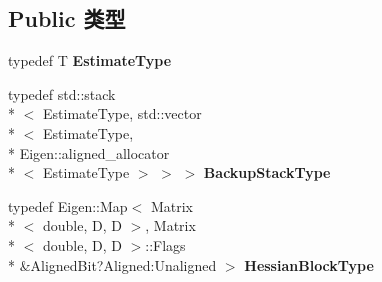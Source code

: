 \subsection*{Public 类型}
\begin{DoxyCompactItemize}
\item 
\hypertarget{classg2o_1_1BaseVertex_aaffb179a0d591da4769ec7c3fc7f7daa}{typedef T {\bfseries Estimate\-Type}}\label{classg2o_1_1BaseVertex_aaffb179a0d591da4769ec7c3fc7f7daa}

\item 
\hypertarget{classg2o_1_1BaseVertex_ae6632291d46b458196bdb021a6c8cba1}{typedef std\-::stack\\*
$<$ Estimate\-Type, std\-::vector\\*
$<$ Estimate\-Type, \\*
Eigen\-::aligned\-\_\-allocator\\*
$<$ Estimate\-Type $>$ $>$ $>$ {\bfseries Backup\-Stack\-Type}}\label{classg2o_1_1BaseVertex_ae6632291d46b458196bdb021a6c8cba1}

\item 
\hypertarget{classg2o_1_1BaseVertex_a887928bc60710e0ec9acb269ee7411db}{typedef Eigen\-::\-Map$<$ Matrix\\*
$<$ double, D, D $>$, Matrix\\*
$<$ double, D, D $>$\-::Flags \\*
\&Aligned\-Bit?Aligned\-:\-Unaligned $>$ {\bfseries Hessian\-Block\-Type}}\label{classg2o_1_1BaseVertex_a887928bc60710e0ec9acb269ee7411db}

\end{DoxyCompactItemize}
